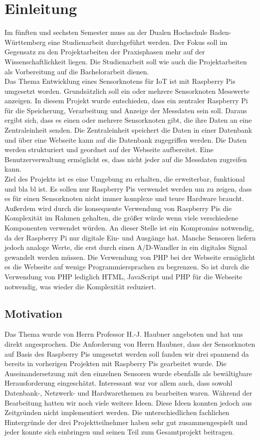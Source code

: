 \chapter{Einleitung} 
Im fünften und sechsten Semester muss an der Dualen Hochschule Baden-Württemberg eine Studienarbeit durchgeführt werden. Der Fokus soll im Gegensatz zu den Projektarbeiten der Praxisphasen mehr auf der Wissenschaftlichkeit liegen. Die Studienarbeit soll wie auch die Projektarbeiten als Vorbereitung auf die Bachelorarbeit dienen. \\
Das Thema Entwicklung eines Sensorknotens für IoT ist mit Raspberry Pis umgesetzt worden. Grundsätzlich soll ein oder mehrere Sensorknoten Messwerte anzeigen. In diesem Projekt wurde entschieden, dass ein zentraler Raspberry Pi für die Speicherung, Verarbeitung und Anzeige der Messdaten sein soll. Daraus ergibt sich, dass es einen oder mehrere Sensorknoten gibt, die ihre Daten an eine Zentraleinheit senden. Die Zentraleinheit speichert die Daten in einer Datenbank und über eine Webseite kann auf die Datenbank zugegriffen werden. Die Daten werden strukturiert und geordnet auf der Webseite aufbereitet. Eine Benutzerverwaltung ermöglicht es, dass nicht jeder auf die Messdaten zugreifen kann.\\
Ziel des Projekts ist es eine Umgebung zu erhalten, die erweiterbar, funktional und bla bl ist. Es sollen nur Raspberry Pis verwendet werden um zu zeigen, dass es für einen Sensorknoten nicht immer komplexe und teure Hardware braucht. Außerdem wird durch die konsequente Verwendung von Raspberry Pis die Komplexität im Rahmen gehalten, die größer würde wenn viele verschiedene Komponenten verwendet würden. An dieser Stelle ist ein Kompromiss notwendig, da der Raspberry Pi nur digitale Ein- und Ausgänge hat. Manche Sensoren liefern jedoch analoge Werte, die erst durch einen \ac{A/D-Wandler} in ein digitales Signal gewandelt werden müssen. Die Verwendung von PHP bei der Webseite ermöglicht es die Webseite auf wenige Programmiersprachen zu begrenzen. So ist durch die Verwendung von PHP lediglich \ac{HTML}, JavaScript und \ac{PHP} für die Webseite notwendig, was wieder die Komplexität reduziert.

\section{Motivation}
Das Thema wurde von Herrn Professor H.-J. Haubner angeboten und hat uns direkt angesprochen. Die Anforderung von Herrn Haubner, dass der Sensorknoten auf Basis des Raspberry Pis umgesetzt werden soll fanden wir drei spannend da bereits in vorherigen Projekten mit Raspberry Pis gearbeitet wurde. Die Auseinandersetzung mit den einzelnen Sensoren wurde ebenfalls als bewältigbare Herausforderung eingeschätzt. Interessant war vor allem auch, dass sowohl Datenbank-, Netzwerk- und Hardwarethemen zu bearbeiten waren. Während der Bearbeitung hatten wir noch viele weitere Ideen. Diese Ideen konnten jedoch aus Zeitgründen nicht implementiert werden. Die unterschiedlichen fachlichen Hintergründe der drei Projektteilnehmer haben sehr gut zusammengespielt und jeder konnte sich einbringen und seinen Teil zum Gesamtprojekt beitragen.
